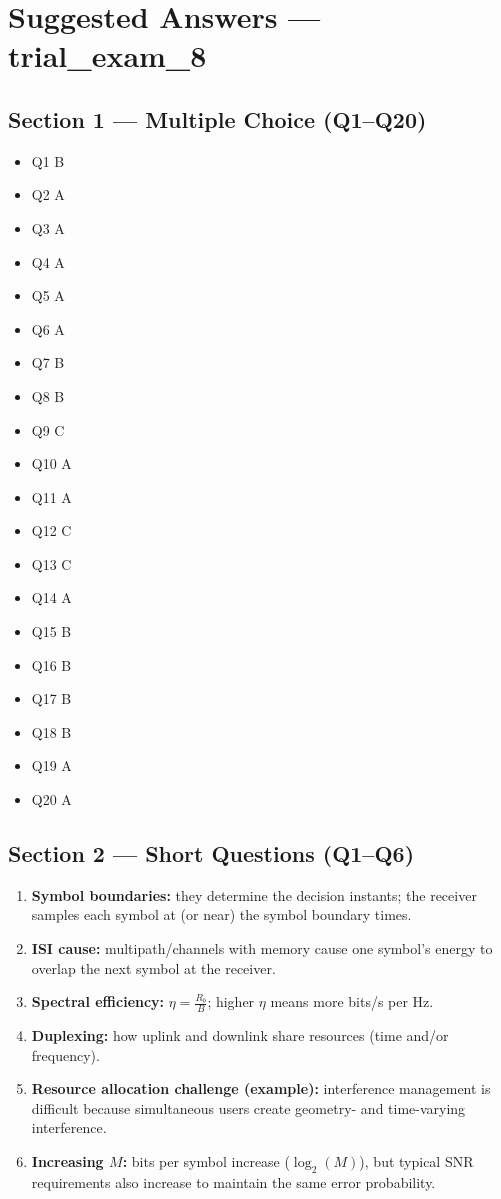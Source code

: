 \documentclass[11pt,a4paper]{article}
\begin{document}
\section*{Suggested Answers --- trial\_exam\_8}

\subsection*{Section 1 --- Multiple Choice (Q1--Q20)}
\begin{itemize}
    \item Q1 B
    \item Q2 A
    \item Q3 A
    \item Q4 A
    \item Q5 A
    \item Q6 A
    \item Q7 B
    \item Q8 B
    \item Q9 C
    \item Q10 A
    \item Q11 A
    \item Q12 C
    \item Q13 C
    \item Q14 A
    \item Q15 B
    \item Q16 B
    \item Q17 B
    \item Q18 B
    \item Q19 A
    \item Q20 A
\end{itemize}

\subsection*{Section 2 --- Short Questions (Q1--Q6)}
\begin{enumerate}[label=\arabic*.]
    \item \textbf{Symbol boundaries:} they determine the decision instants; the receiver samples each symbol at (or near) the symbol boundary times.
    \item \textbf{ISI cause:} multipath/channels with memory cause one symbol's energy to overlap the next symbol at the receiver.
    \item \textbf{Spectral efficiency:} $\eta=\frac{R_b}{B}$; higher $\eta$ means more bits/s per Hz.
    \item \textbf{Duplexing:} how uplink and downlink share resources (time and/or frequency).
    \item \textbf{Resource allocation challenge (example):} interference management is difficult because simultaneous users create geometry- and time-varying interference.
    \item \textbf{Increasing $M$:} bits per symbol increase ($\log_2(M)$), but typical SNR requirements also increase to maintain the same error probability.
    
\end{enumerate}
\end{document}
